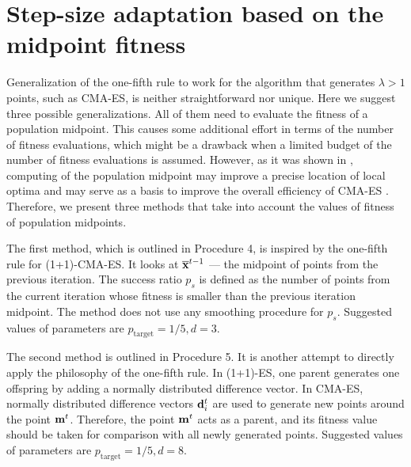 \documentclass[runningheads,a4paper]{llncs}
\newcommand{\wek}[1]{
    {\bf #1} 
}
\begin{document}
\section{Step-size adaptation based on the midpoint fitness}

Generalization of the one-fifth rule to work for the algorithm that generates $\lambda>1$ points, such as CMA-ES, is neither straightforward nor unique. Here we suggest three possible generalizations. All of them need to evaluate the fitness of a population midpoint. This causes some additional effort in terms of the number of fitness evaluations, which might be a drawback when a limited budget of the number of fitness evaluations is assumed. However, as it was shown in \cite{Arabas17}, computing of the population midpoint may improve a precise location of local optima and may serve as a basis to improve the overall efficiency of CMA-ES \cite{Biedrzycki17}. Therefore, we present three methods that take into account the values of fitness of population midpoints.


The first method, which is outlined in Procedure 4, is inspired by the one-fifth rule for (1+1)-CMA-ES. It looks at $\overline{\wek{x}}^{t-1}$ --- the midpoint of points from the previous iteration. The success ratio $p_s$ is defined as the number of points from the current iteration whose fitness is smaller than the previous iteration midpoint. The method does not use any smoothing procedure for $p_s$. Suggested values of parameters are $ p_\text{target}=1/5, d=3$. 
%


The second method is outlined in Procedure 5. It is another attempt to directly apply the philosophy of the one-fifth rule. In (1+1)-ES, one parent generates one offspring by adding a normally distributed difference vector. In CMA-ES, normally distributed difference vectors $\wek{d}_i^t$ are used to generate new points around the point $\wek{m}^t$. Therefore, the point $\wek{m}^t$ acts as a parent, and its fitness value should be taken for comparison with all newly generated points. Suggested values of parameters are $ p_\text{target}=1/5, d=8$. 
% 
\end{document}
